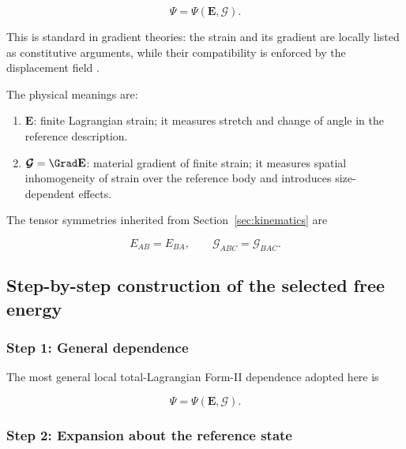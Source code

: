 \documentclass[11pt]{article}
\begin{document}
\begin{equation}
\Psi=\Psi(\mathbf{E},\bm{\mathcal{G}}).
\label{eq:sec2_local_constitutive_arguments}
\end{equation}

This is standard in gradient theories: the strain and its gradient are locally listed as constitutive arguments, while their compatibility is enforced by the displacement field \cite{Mindlin1964,MindlinEshel1968,AskesAifantis2011}.

The physical meanings are:

\begin{enumerate}
\item $\mathbf{E}$: finite Lagrangian strain; it measures stretch and change of angle in the reference description.

\item $\bm{\mathcal{G}}=\Grad\mathbf{E}$: material gradient of finite strain; it measures spatial inhomogeneity of strain over the reference body and introduces size-dependent effects.
\end{enumerate}

The tensor symmetries inherited from Section~\ref{sec:kinematics} are

\begin{equation}
E_{AB}=E_{BA},
\qquad
\mathcal{G}_{ABC}=\mathcal{G}_{BAC}.
\label{eq:sec2_state_symmetries}
\end{equation}

\subsection{Step-by-step construction of the selected free energy}

\subsubsection{Step 1: General dependence}

The most general local total-Lagrangian Form-II dependence adopted here is

\begin{equation}
\Psi=\Psi(\mathbf{E},\bm{\mathcal{G}}).
\label{eq:sec2_step1_general_energy}
\end{equation}

\subsubsection{Step 2: Expansion about the reference state}
\end{document}
